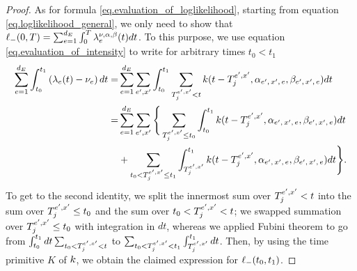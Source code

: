\documentclass[10pt, article,table]{article}
\begin{document}
\begin{proof}
As for formula \eqref{eq.evaluation_of_loglikelihood}, starting from equation \eqref{eq.loglikelihood_general}, we only need to show that $\lminus(0,\timeHorizon) = \sum_{e=1}^{\numEventTypes} \int_{0}^{\timeHorizon}\intensity^{\nu,\impCoef, \decCoef}(t)dt$. To this purpose, we use equation \eqref{eq.evaluation_of_intensity} to write for arbitrary times $t_0<t_1$
\begin{equation*}
\begin{split}
\sum_{e=1}^{\numEventTypes}\int_{t_0}^{t_1} \left(\intensity[e](t) - \baseRate_e \right) dt 
=&
\sum_{e=1}^{\numEventTypes}\sum_{\eone,\xone}\int_{t_0}^{t_1} 
\sum_{\arrivalTimes[\eone,\xone]_j <t} \parametricHawkesKernel(t-\arrivalTimes[\eone,\xone]_j, \impCoef\subscriptexe, \decCoef\subscriptexe)dt 
\\
=&
\sum_{e=1}^{\numEventTypes}\sum_{\eone,\xone}
\Bigg\lbrace
\sum_{\arrivalTimes[\eone,\xone]_j \leq t_0}
\int_{t_0}^{t_1} 
\parametricHawkesKernel(t-\arrivalTimes[\eone,\xone]_j, \impCoef\subscriptexe, \decCoef\subscriptexe)dt 
\\
&+
\sum_{t_0<\arrivalTimes[\eone,\xone]_j \leq t_1}
\int_{\arrivalTimes[\eone,\xone]_j}^{t_1} \parametricHawkesKernel(t-\arrivalTimes[\eone,\xone]_j, \impCoef\subscriptexe, \decCoef\subscriptexe)dt 
\Bigg\rbrace.
\end{split}
\end{equation*}
To get to the second identity, we split the innermost sum over $\arrivalTimes[\eone,\xone]_j<t$ into the sum over $\arrivalTimes[\eone,\xone]_j \leq t_0$ and the sum over $t_0 < \arrivalTimes[\eone,\xone]_j<t$;  we swapped summation over  $\arrivalTimes[\eone,\xone]_j \leq t_0$ with integration in $dt$, whereas we applied Fubini theorem to go from $\int_{t_0}^{t_1}dt\sum_{t_0 < \arrivalTimes[\eone,\xone]_j<t}$ to $\sum_{t_0 < \arrivalTimes[\eone,\xone]_j<t_1}\int_{\arrivalTimes[\eone,\xone]_j}^{t_1}dt$. Then, by using the time primitive $K$ of $\parametricHawkesKernel$, we obtain the claimed expression for $\lminus(t_0,t_1)$.
\end{proof}
\end{document}
